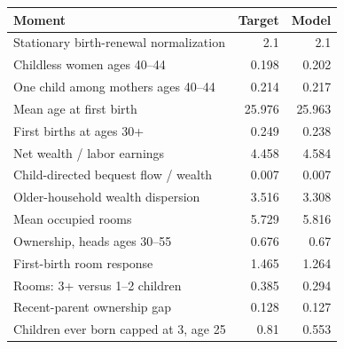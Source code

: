 \begingroup\footnotesize
\setlength{\tabcolsep}{3pt}
\renewcommand{\arraystretch}{1.04}
\begin{tabularx}{\linewidth}{Xrr}
\toprule
Moment & Target & Model \\
\midrule
Stationary birth-renewal normalization & 2.1 & 2.1 \\
Childless women ages 40–44 & 0.198 & 0.202 \\
One child among mothers ages 40–44 & 0.214 & 0.217 \\
Mean age at first birth & 25.976 & 25.963 \\
First births at ages 30+ & 0.249 & 0.238 \\
Net wealth / labor earnings & 4.458 & 4.584 \\
Child-directed bequest flow / wealth & 0.007 & 0.007 \\
Older-household wealth dispersion & 3.516 & 3.308 \\
Mean occupied rooms & 5.729 & 5.816 \\
Ownership, heads ages 30–55 & 0.676 & 0.67 \\
First-birth room response & 1.465 & 1.264 \\
Rooms: 3+ versus 1–2 children & 0.385 & 0.294 \\
Recent-parent ownership gap & 0.128 & 0.127 \\
Children ever born capped at 3, age 25 & 0.81 & 0.553 \\
\bottomrule
\end{tabularx}
\endgroup
